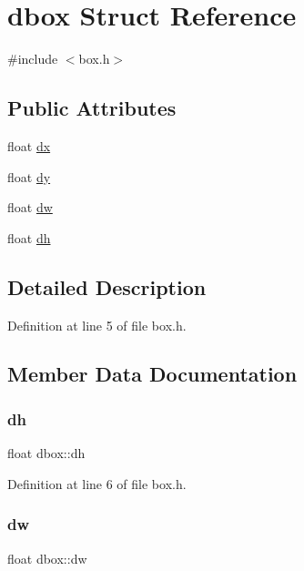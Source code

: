 \hypertarget{structdbox}{}\section{dbox Struct Reference}
\label{structdbox}


{\ttfamily \#include $<$box.\+h$>$}

\subsection*{Public Attributes}
\begin{DoxyCompactItemize}
\item 
float \mbox{\hyperlink{structdbox_af24e1ef9eae9dbcfefbcd86cc7ab342f}{dx}}
\item 
float \mbox{\hyperlink{structdbox_acfa3fcbd522bc347d91b27229a935e1b}{dy}}
\item 
float \mbox{\hyperlink{structdbox_a2d3a509dafd2b6c42326e0a008b1d929}{dw}}
\item 
float \mbox{\hyperlink{structdbox_a8321cbf92c464ba9c4eca5b8f0e9f48b}{dh}}
\end{DoxyCompactItemize}


\subsection{Detailed Description}


Definition at line 5 of file box.\+h.



\subsection{Member Data Documentation}
\mbox{\label{structdbox_a8321cbf92c464ba9c4eca5b8f0e9f48b}} 
\subsubsection{\texorpdfstring{dh}{dh}}
{\footnotesize\ttfamily float dbox\+::dh}



Definition at line 6 of file box.\+h.

\mbox{\label{structdbox_a2d3a509dafd2b6c42326e0a008b1d929}} 
\subsubsection{\texorpdfstring{dw}{dw}}
{\footnotesize\ttfamily float dbox\+::dw}



